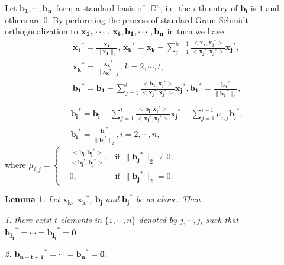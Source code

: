 \documentclass{sig-alternate}
\newtheorem{lem}[theorem]{Lemma}
\numberwithin{theorem}{section} \numberwithin{equation}{section}
\begin{document}
Let $\mathbf{b_1}, \cdots, \mathbf{b_n}$~form a standard basis of
~$\mathbb{R}^{n}$, i.e. the $i$-th entry of $\mathbf{b_i}$ is $1$
and others are $0$. By performing the process of standard
Gram-Schmidt orthogonalization to $\mathbf{x_1},\,\cdots,\,\mathbf{x_t},\\\mathbf{b_1},\cdots,\mathbf{b_n}$ in turn we have
\[\begin{split}
&\mathbf{x_1}^* =
\frac{\mathbf{x_1}}{\|\mathbf{x_1}\|_2},\,\mathbf{x_k}^* =
\mathbf{x_k} - \sum_{j=1}^{k-1}\frac{<\mathbf{x_k},
\mathbf{x_j}^*>}{<\mathbf{x_j}^*,
\mathbf{x_j}^*>}\mathbf{x_j}^*,\\&\mathbf{x_k}^* =
\frac{\mathbf{x_k}^*}{\|\mathbf{x_k}^*\|_2}, k = 2, \cdots,
t,\\&\mathbf{b_1}^* = \mathbf{b_1} -
\sum_{j=1}^{t}\frac{<\mathbf{b_1}, \mathbf{x_j}^*>}{<\mathbf{x_j}^*,
\mathbf{x_j}^*>}\mathbf{x_j}^*, \mathbf{b_1}^*
 = \frac{\mathbf{b_1}^*}{\|\mathbf{b_1}^*\|_2},\\\end{split}\]\[\begin{split}
 &\mathbf{b_i}^* = \mathbf{b_i} -
\sum_{j=1}^{t}\frac{<\mathbf{b_i}, \mathbf{x_j}^*>}{<\mathbf{x_j}^*,
\mathbf{x_j}^*>}\mathbf{x_j}^*
 - \sum_{j=1}^{i-1}\mu_{i,j}\mathbf{b_j}^*
,        \\&\mathbf{b_i}^* =
\frac{\mathbf{b_i}^*}{\|\mathbf{b_i}^*\|_2},        i = 2, \cdots,
n,
\end{split}
\]where
$
\mu_{i,j} = \left\{
\begin{aligned}
         &\frac{<\mathbf{b_i}, \mathbf{b_j}^*>}{<\mathbf{b_j}^*, \mathbf{b_j}^*>}, &\mbox{if} \ \ \|\mathbf{b_j}^*\|_2 \neq 0,\\
                  &0,
                   &\mbox{if}  \ \  \|\mathbf{b_j}^*\|_2 = 0.
                                            \end{aligned} \right.
$

\begin{lem}\label{lem:hyperplane-matrix-construction}
Let $\mathbf{x_k}$, $\mathbf{x_k}^*$, $\mathbf{b_j}$ and
$\mathbf{b_j}^*$ be as above. Then


1. there exist $t$ elements in $\{1, \cdots, n\}$ denoted by $j_1
\cdots,j_t$ such that
 $\mathbf{b_{j_1}}^* = \cdots = \mathbf{b_{j_t}}^* = \textbf{0}$.


2. $\mathbf{b_{n-t+1}}^* = \cdots = \mathbf{b_{n}}^* = \textbf{0}$.
\end{lem}
\end{document}
